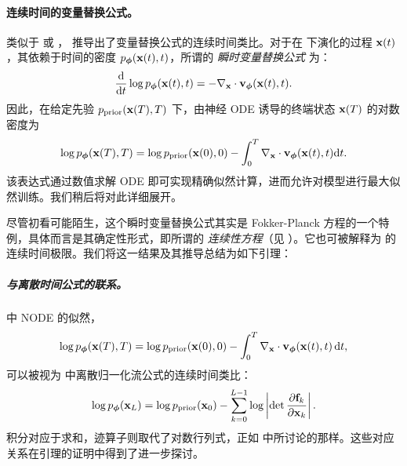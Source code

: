\paragraph{连续时间的变量替换公式。}
类似于  或 ，\citet{chen2018neural} 推导出了变量替换公式的连续时间类比。对于在  下演化的过程 ${\mathbf{x}}(t)$，其依赖于时间的密度 $p_{\bm{\phi}}({\mathbf{x}}(t), t)$，所谓的 \emph{瞬时变量替换公式} 为：
\[
\frac{\mathop{}\!\mathrm{d}}{\mathop{}\!\mathrm{d} t} \log p_{\bm{\phi}}({\mathbf{x}}(t), t) = -\nabla_{{\mathbf{x}}}\cdot{\mathbf{v}}_{\bm{\phi}}({\mathbf{x}}(t), t).
\]
因此，在给定先验 $p_{\text{prior}}({\mathbf{x}}(T), T)$ 下，由神经 ODE 诱导的终端状态 ${\mathbf{x}}(T)$ 的对数密度为
\begin{align}\label{eq:NODE-likelihood}
    \log p_{\bm{\phi}}({\mathbf{x}}(T), T) = \log p_{\text{prior}}({\mathbf{x}}(0), 0) - \int_0^T \nabla_{{\mathbf{x}}} \cdot {\mathbf{v}}_{\bm{\phi}}({\mathbf{x}}(t), t)   \mathrm{d}t.
\end{align}
该表达式通过数值求解 ODE 即可实现精确似然计算，进而允许对模型进行最大似然训练。我们稍后将对此详细展开。


尽管初看可能陌生，这个瞬时变量替换公式其实是 Fokker-Planck 方程的一个特例，具体而言是其确定性形式，即所谓的 \emph{连续性方程}（见 ）。它也可被解释为  的连续时间极限。我们将这一结果及其推导总结为如下引理：



\subparagraph{与离散时间公式的联系。}
 中 NODE 的似然，
\[
\log p_{\bm{\phi}}({\mathbf{x}}(T), T) = \log p_{\text{prior}}({\mathbf{x}}(0), 0) - \int_0^T \nabla_{\mathbf{x}} \cdot {\mathbf{v}}_{\bm{\phi}}({\mathbf{x}}(t), t) \mathop{}\!\mathrm{d} t,
\]
可以被视为  中离散归一化流公式的连续时间类比：
\[
\log p_{\bm{\phi}}({\mathbf{x}}_L) = \log p_{\text{prior}}({\mathbf{x}}_0) - \sum_{k=0}^{L-1} \log \left| \det \frac{\partial {\mathbf{f}}_k}{\partial {\mathbf{x}}_k} \right|.
\]
积分对应于求和，迹算子则取代了对数行列式，正如  中所讨论的那样。这些对应关系在引理的证明中得到了进一步探讨。

